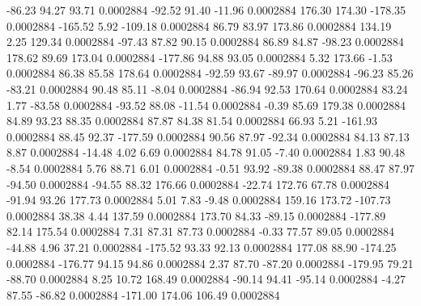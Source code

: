       -86.23       94.27       93.71     0.0002884
      -92.52       91.40      -11.96     0.0002884
      176.30      174.30     -178.35     0.0002884
     -165.52        5.92     -109.18     0.0002884
       86.79       83.97      173.86     0.0002884
      134.19        2.25      129.34     0.0002884
      -97.43       87.82       90.15     0.0002884
       86.89       84.87      -98.23     0.0002884
      178.62       89.69      173.04     0.0002884
     -177.86       94.88       93.05     0.0002884
        5.32      173.66       -1.53     0.0002884
       86.38       85.58      178.64     0.0002884
      -92.59       93.67      -89.97     0.0002884
      -96.23       85.26      -83.21     0.0002884
       90.48       85.11       -8.04     0.0002884
      -86.94       92.53      170.64     0.0002884
       83.24        1.77      -83.58     0.0002884
      -93.52       88.08      -11.54     0.0002884
       -0.39       85.69      179.38     0.0002884
       84.89       93.23       88.35     0.0002884
       87.87       84.38       81.54     0.0002884
       66.93        5.21     -161.93     0.0002884
       88.45       92.37     -177.59     0.0002884
       90.56       87.97      -92.34     0.0002884
       84.13       87.13        8.87     0.0002884
      -14.48        4.02        6.69     0.0002884
       84.78       91.05       -7.40     0.0002884
        1.83       90.48       -8.54     0.0002884
        5.76       88.71        6.01     0.0002884
       -0.51       93.92      -89.38     0.0002884
       88.47       87.97      -94.50     0.0002884
      -94.55       88.32      176.66     0.0002884
      -22.74      172.76       67.78     0.0002884
      -91.94       93.26      177.73     0.0002884
        5.01        7.83       -9.48     0.0002884
      159.16      173.72     -107.73     0.0002884
       38.38        4.44      137.59     0.0002884
      173.70       84.33      -89.15     0.0002884
     -177.89       82.14      175.54     0.0002884
        7.31       87.31       87.73     0.0002884
       -0.33       77.57       89.05     0.0002884
      -44.88        4.96       37.21     0.0002884
     -175.52       93.33       92.13     0.0002884
      177.08       88.90     -174.25     0.0002884
     -176.77       94.15       94.86     0.0002884
        2.37       87.70      -87.20     0.0002884
     -179.95       79.21      -88.70     0.0002884
        8.25       10.72      168.49     0.0002884
      -90.14       94.41      -95.14     0.0002884
       -4.27       87.55      -86.82     0.0002884
     -171.00      174.06      106.49     0.0002884
